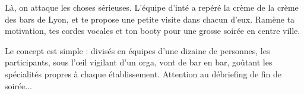 Là, on attaque les choses sérieuses. L'équipe d'inté a repéré la crème de la
crème des bars de Lyon, et te propose une petite visite dans chacun
d'eux. Ramène ta motivation, tes cordes vocales et ton booty pour une grosse
soirée en centre ville.

\vspace{1em}

Le concept est simple : divisés en équipes d'une dizaine de personnes, les
participants, sous l'œil vigilant d'un orga, vont de bar en bar, goûtant les
spécialités propres à chaque établissement. Attention au débriefing de fin de soirée...
